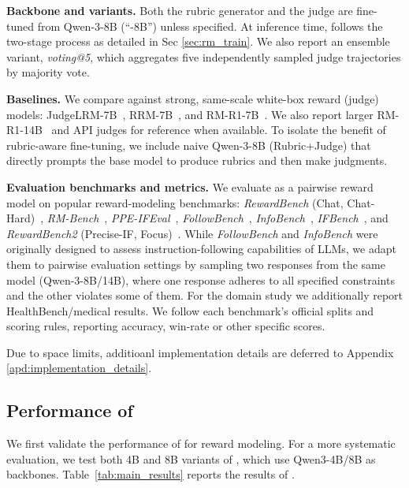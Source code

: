 \noindent \textbf{Backbone and variants.}
Both the rubric generator and the judge are fine-tuned from Qwen-3-8B (``{\name}-8B'') unless specified. At inference time, {\name} follows the two-stage process as detailed in Sec \ref{sec:rm_train}. We also report an ensemble variant, \textit{voting@5}, which aggregates five independently sampled judge trajectories by majority vote.

\noindent \textbf{Baselines.}
We compare {\name} against strong, same-scale white-box reward (judge) models: JudgeLRM-7B~\citep{chen2025judgelrm}, RRM-7B~\citep{guo2025reward}, and RM-R1-7B~\citep{chen2025rm}.
We also report larger RM-R1-14B~\citep{chen2025rm} and API judges for reference when available. To isolate the benefit of rubric-aware fine-tuning, we include naive {Qwen-3-8B (Rubric+Judge)} that directly prompts the base model to produce rubrics and then make judgments.

\noindent \textbf{Evaluation benchmarks and metrics.}
We evaluate {\name} as a pairwise reward model on popular reward-modeling benchmarks: \emph{RewardBench} (Chat, Chat-Hard)~\citep{rewardbench}, \emph{RM-Bench}~\citep{liu2025rmbench}, \emph{PPE-IFEval}~\citep{ppe}, \emph{FollowBench}~\citep{followbench}, \emph{InfoBench}~\citep{infobench}, \emph{IFBench}~\citep{ifbench}, and \emph{RewardBench2} (Precise-IF, Focus)~\citep{malik2025rewardbench2}. 
While \emph{FollowBench} and \emph{InfoBench} were originally designed to assess instruction-following capabilities of LLMs, we adapt them to pairwise evaluation settings by sampling two responses from the same model (Qwen-3-8B/14B), where one response adheres to all specified constraints and the other violates some of them. 
For the domain study we additionally report HealthBench/medical results. We follow each benchmark’s official splits and scoring rules, reporting accuracy, win-rate or other specific scores.

Due to space limits, additioanl implementation details are deferred to Appendix \ref{apd:implementation_details}. 



\subsection{Performance of {\name}}
We first validate the performance of {\name} for reward modeling. For a more systematic evaluation, we test both 4B and 8B variants of {\name}, which use Qwen3-4B/8B as backbones. %
Table~\ref{tab:main_results} reports the results of {\name}. 

